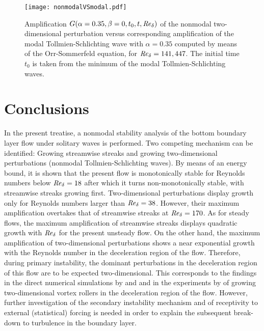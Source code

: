 \documentclass{jfm}
\newcommand\Rey{\mbox{\textit{Re}}}  %
\begin{document}
\begin{figure}
  \centering
  \texttt{[image: nonmodalVSmodal.pdf]}
  \caption{Amplification $ G(\alpha=0.35,\beta=0,t_0,t,\Rey_\delta) $
    of the nonmodal two-dimensional perturbation versus corresponding
    amplification of the
    modal Tollmien-Schlichting wave with $ \alpha = 0.35 $
    computed by means of the Orr-Sommerfeld
    equation, for $ \Rey_\delta = 141, 447 $. The initial time
    $ t_0 $ is taken from the minimum of the modal Tollmien-Schlichting
    waves.}
  \label{fig:modalVSnonmodal}
\end{figure}


\section{Conclusions} \label{sec:conclusions}

In the present treatise, a nonmodal stability analysis 
of the bottom boundary layer flow under solitary waves
is performed. Two
competing mechanism can be identified:
Growing streamwise streaks and growing
two-dimensional perturbations (nonmodal Tollmien-Schlichting waves). 
By means of an energy bound, 
it is shown that the present flow is monotonically stable
for Reynolds numbers below $ \Rey_\delta = 18 $ after which it
turns non-monotonically stable, with streamwise streaks growing
first. Two-dimensional perturbations display growth only for
Reynolds numbers larger than $ \Rey_\delta = 38 $. However,
their maximum amplification overtakes
that of streamwise streaks at  $ \Rey_\delta = 170 $.
As for steady flows, the maximum amplification of 
streamwise streaks displays quadratic growth with $ \Rey_\delta $ 
for the present unsteady flow. On the other hand,
the maximum amplification
of two-dimensional perturbations shows a near exponential
growth with the Reynolds number in the deceleration region of the flow. Therefore,
during primary instability,
the dominant perturbations in the deceleration region
of this flow are to be expected two-dimensional. This
corresponds to the findings in the direct numerical simulations
by \citet{VittoriBlondeaux2008} and \citet{OzdemirHsuBalachandar2013}
and in the experiments by \citet{SumerJensenSorensenFredsoeLiuCarstensen2010}
of growing two-dimensional vortex rollers in the deceleration region
of the flow. However, further investigation of the
secondary instability mechanism and of receptivity to external (statistical)
forcing is needed in order to explain the subsequent break-down to 
turbulence in the boundary layer.
\end{document}
